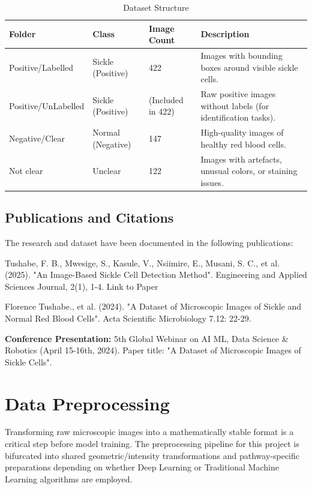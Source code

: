 \begin{table}[htbp]
\centering
\caption{Dataset Structure}
\label{tab:dataset-structure}
\begin{tabular}{|p{}|p{}|p{}|p{}|}
\hline
\textbf{Folder} & \textbf{Class} & \textbf{Image Count} & \textbf{Description} \\ \hline
Positive/Labelled & Sickle (Positive) & 422 & Images with bounding boxes around visible sickle cells. \\ \hline
Positive/UnLabelled & Sickle (Positive) & (Included in 422) & Raw positive images without labels (for identification tasks). \\ \hline
Negative/Clear & Normal (Negative) & 147 & High-quality images of healthy red blood cells. \\ \hline
Not clear & Unclear & 122 & Images with artefacts, unusual colors, or staining issues. \\ \hline
\end{tabular}
\end{table}

\subsection{Publications and Citations}

The research and dataset have been documented in the following publications:

Tushabe, F. B., Mwesige, S., Kasule, V., Nsiimire, E., Musani, S. C., et al. (2025). "An Image-Based Sickle Cell Detection Method". Engineering and Applied Sciences Journal, 2(1), 1-4. Link to Paper

Florence Tushabe., et al. (2024). "A Dataset of Microscopic Images of Sickle and Normal Red Blood Cells". Acta Scientific Microbiology 7.12: 22-29.

\noindent\textbf{Conference Presentation:} 5th Global Webinar on AI ML, Data Science \& Robotics (April 15-16th, 2024). Paper title: "A Dataset of Microscopic Images of Sickle Cells".

\section{Data Preprocessing}

Transforming raw microscopic images into a mathematically stable format is a critical step before model training. The preprocessing pipeline for this project is bifurcated into shared geometric/intensity transformations and pathway-specific preparations depending on whether Deep Learning or Traditional Machine Learning algorithms are employed.

